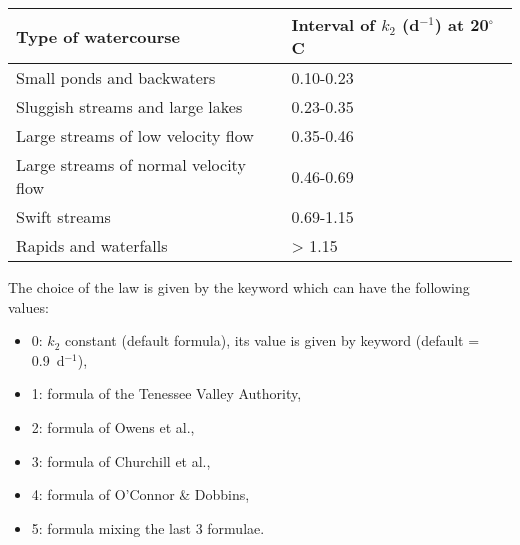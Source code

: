 \begin{table}[H]
 			\centering
\begin{tabular}{p{3.0in}p{3.0in}}
\hline
\multicolumn{1}{|p{3.0in}}{Type of watercourse} & 
\multicolumn{1}{|p{3.0in}|}{Interval of $k_2$ (d$^{-1}$) at 20$^{\circ}$C} \\
\hline
\multicolumn{1}{|p{3.0in}}{Small ponds and backwaters} & 
\multicolumn{1}{|p{3.0in}|}{0.10-0.23} \\
\hline
\multicolumn{1}{|p{3.0in}}{Sluggish streams and large lakes} & 
\multicolumn{1}{|p{3.0in}|}{0.23-0.35} \\
\hline
\multicolumn{1}{|p{3.0in}}{Large streams of low velocity flow} & 
\multicolumn{1}{|p{3.0in}|}{0.35-0.46} \\
\hline
\multicolumn{1}{|p{3.0in}}{Large streams of normal velocity flow} & 
\multicolumn{1}{|p{3.0in}|}{0.46-0.69} \\
\hline
\multicolumn{1}{|p{3.0in}}{Swift streams} & 
\multicolumn{1}{|p{3.0in}|}{0.69-1.15} \\
\hline
\multicolumn{1}{|p{3.0in}}{Rapids and waterfalls} & 
\multicolumn{1}{|p{3.0in}|}{> 1.15} \\
\hline

\end{tabular}
\end{table}

The choice of the law is given by the keyword
 which can have the following values:

\begin{itemize}
\item 0: $k_2$ constant (default formula), its value is given by keyword
   (default = 0.9~d$^{-1}$),
\item 1: formula of the Tenessee Valley Authority,
\item 2: formula of Owens et al.,
\item 3: formula of Churchill et al.,
\item 4: formula of O'Connor \& Dobbins,
\item 5: formula mixing the last 3 formulae.
\end{itemize}

